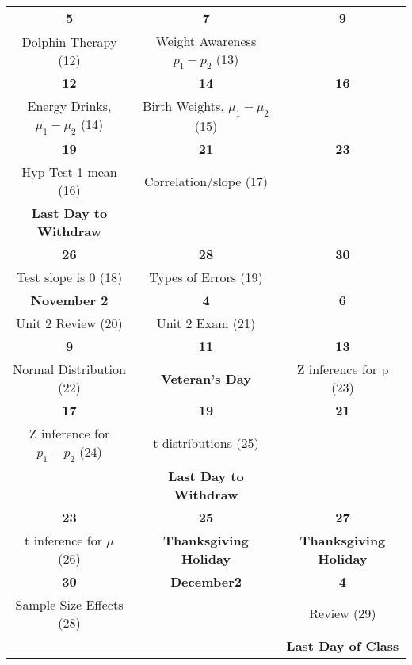 \begin{center}
\begin{tabular}{|c|c|c|}
  \hfill\bf{5} & \hfill\bf{7}  & \hfill\bf{9}\\
  Dolphin Therapy \small{(12)} &  Weight Awareness $p_1 - p_2$
  \small{(13)} 
&  \\ \hline

   \hfill\bf{12} & \hfill\bf{14} & \hfill\bf{16} \\
 Energy Drinks, $\mu_1 - \mu_2$  \small{(14)}& 
 Birth Weights, $\mu_1 - \mu_2$ \small{(15)} &
 \\ \hline

 \hfill\bf{19}  & \hfill\bf{21} & \hfill\bf{23} \\
Hyp Test 1 mean   \small{(16)}   &   
 Correlation/slope \small{(17)}&
 \\
   \small\bf{Last Day to Withdraw} &&\\ \hline

  \hfill\bf{26} & \hfill\bf{28} & \hfill\bf{30} \\
  Test slope is 0 \small{(18)} &  
Types of Errors \small{(19)} %
 &
\\ \hline

   \bf{November} \hfill\bf{2} & \hfill\bf{4} & \hfill\bf{6} \\
 Unit 2  Review   \small{(20)}&  Unit 2 Exam \small{(21)}  %
&
\\ \hline

   \hfill\bf{9} & \hfill\bf{11} & \hfill\bf{13} \\
  Normal Distribution \small{(22)}  %
 & {\bf Veteran's Day}
 & Z inference for p   \small{(23)} %
\\
\hline

   \hfill\bf{17}  &  \hfill\bf{19}  & \hfill\bf{21} \\
   Z inference for $p_1-p_2$  \small{(24)}& 
  t distributions  \small{(25)} %
&
\\ &
   \small\bf{ Last Day to Withdraw} & \\ \hline
 
 \hfill\bf{23} & \hfill\bf{25}  & \hfill\bf{27}\\
  t inference for $\mu$  \small{(26)}%
 & {\bf Thanksgiving Holiday} 
 & {\bf Thanksgiving Holiday} 
\\ \hline

 \hfill\bf{30}&  {\bf December}\hfill\bf{2} & \hfill\bf{4} \\
  Sample Size Effects \small{(28)}%
 &
 & Review    \small{(29)}%
  \\
  & &  \small\bf{ Last Day of Class}  \\ \hline


\end{tabular}
\end{center}
